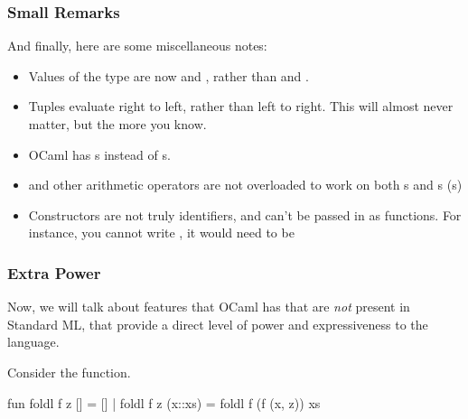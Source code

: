 \documentclass[aspectratio=169, handout]{beamer}
\begin{document}
\begin{frame}[fragile]
  \frametitle{Small Remarks}

  And finally, here are some miscellaneous notes:

  \begin{itemize}
    \item Values of the  type are now  and ,
    rather than  and .
    \item Tuples evaluate right to left, rather than left to right. This will almost
    never matter, but the more you know.
    \item OCaml has s instead of s.
    \item \code{+} and other arithmetic operators are not overloaded to work on both
    s and s (s)
    \item Constructors are not truly identifiers, and can't be passed in as functions.
    For instance, you cannot write , it would need to be
  \end{itemize}
\end{frame}


\begin{frame}[fragile]
  \frametitle{Extra Power}

  Now, we will talk about features that OCaml has that are \textit{not} present
  in Standard ML, that provide a direct level of power and expressiveness to the
  language.

  \vspace{\fill}

  Consider the  function.

  \vspace{\fill}

  \begin{codeblock}
    fun foldl f z [] = []
      | foldl f z (x::xs) =
          foldl f (f (x, z)) xs
  \end{codeblock}
\end{frame}
\end{document}
